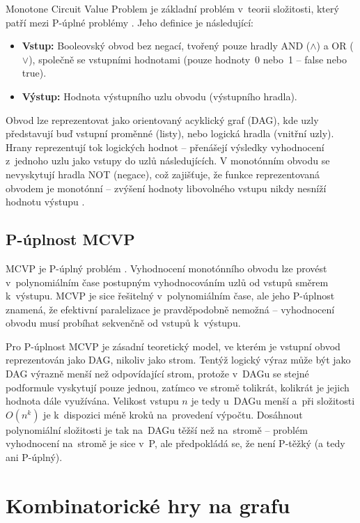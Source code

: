 Monotone Circuit Value Problem je základní problém v~teorii složitosti, který patří mezi P-úplné problémy \cite{sawa}. Jeho definice je následující:

\begin{itemize}
    \item \textbf{Vstup:} Booleovský obvod bez negací, tvořený pouze hradly AND ($\land$) a OR ($\lor$), společně se vstupními hodnotami (pouze hodnoty~0 nebo~1 -- false nebo true).
    \item \textbf{Výstup:} Hodnota výstupního uzlu obvodu (výstupního hradla).
\end{itemize}

Obvod lze reprezentovat jako orientovaný acyklický graf (DAG), kde uzly představují buď vstupní proměnné (listy), nebo logická hradla (vnitřní uzly). Hrany reprezentují tok logických hodnot – přenášejí výsledky vyhodnocení z~jednoho uzlu jako vstupy do uzlů následujících. V monotónním obvodu se nevyskytují hradla NOT (negace), což zajišťuje, že funkce reprezentovaná obvodem je monotónní – zvýšení hodnoty libovolného vstupu nikdy nesníží hodnotu výstupu \cite{sawa}.

\subsection{P-úplnost MCVP}
\label{sec:MCVPTheoryCompleteness}

MCVP je P-úplný problém \cite{sawa, miyano}. Vyhodnocení monotónního obvodu lze provést v~polynomiálním čase postupným vyhodnocováním uzlů od vstupů směrem k~výstupu. MCVP je sice řešitelný v~polynomiálním čase, ale jeho P-úplnost znamená, že efektivní paralelizace je pravděpodobně nemožná – vyhodnocení obvodu musí probíhat sekvenčně od vstupů k~výstupu.

Pro P-úplnost MCVP je zásadní teoretický model, ve kterém je vstupní obvod reprezentován jako DAG, nikoliv jako strom. Tentýž logický výraz může být jako DAG výrazně menší než odpovídající strom, protože v~DAGu se stejné podformule vyskytují pouze jednou, zatímco ve stromě tolikrát, kolikrát je jejich hodnota dále využívána. Velikost vstupu $n$ je tedy u~DAGu menší a~při složitosti $O(n^k)$ je k~dispozici méně kroků na~provedení výpočtu. Dosáhnout polynomiální složitosti je tak na~DAGu těžší než na~stromě -- problém vyhodnocení na~stromě je sice v~P, ale předpokládá se, že není P-těžký (a tedy ani P-úplný).

\section{Kombinatorické hry na grafu}
\label{sec:TheoryGames}

